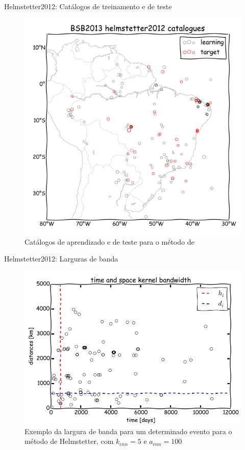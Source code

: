 \documentclass[ucs,8pt]{beamer}
\begin{document}
\begin{frame}{Helmstetter2012: Catálogos de treinamento e de teste}
\begin{figure}[H]
  \centering
  \includegraphics[height=.90\textheight]{helmstetter_catalogues} 
  \caption{Catálogos de aprendizado e de teste para o método de \citet{helmstetter_2012}}
  \label{fig:h_catalogue} 
\end{figure}
\end{frame}



\begin{frame}{Helmstetter2012: Larguras de banda}
\begin{figure}[H]
  \centering
  \includegraphics[height=.90\textheight]{helmstetter_hidi} 
  \caption{Exemplo da largura de banda para um determinado evento para o método de Helmstetter, com $k_{cnn} = 5$ e
  $a_{cnn} = 100$}
  \label{fig:h_hidi} 
\end{figure}
\end{frame}
\end{document}
